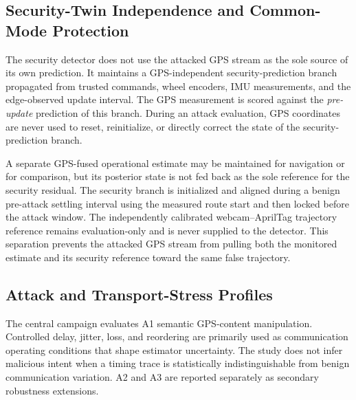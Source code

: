 \documentclass[11pt,a4paper]{article}
\begin{document}
\subsection{Security-Twin Independence and Common-Mode Protection}

The security detector does not use the attacked GPS stream as the sole source
of its own prediction. It maintains a GPS-independent security-prediction
branch propagated from trusted commands, wheel encoders, IMU measurements, and
the edge-observed update interval. The GPS measurement is scored against the
\emph{pre-update} prediction of this branch. During an attack evaluation, GPS
coordinates are never used to reset, reinitialize, or directly correct the
state of the security-prediction branch.

A separate GPS-fused operational estimate may be maintained for navigation or
for comparison, but its posterior state is not fed back as the sole reference
for the security residual. The security branch is initialized and aligned
during a benign pre-attack settling interval using the measured route start and
then locked before the attack window. The independently calibrated
webcam--AprilTag trajectory
reference remains evaluation-only and is never supplied to the detector. This
separation prevents the attacked GPS stream from pulling both the monitored
estimate and its security reference toward the same false trajectory.

\subsection{Attack and Transport-Stress Profiles}

The central campaign evaluates A1 semantic GPS-content manipulation. Controlled
delay, jitter, loss, and reordering are primarily used as communication
operating conditions that shape estimator uncertainty. The study does not infer
malicious intent when a timing trace is statistically indistinguishable from
benign communication variation. A2 and A3 are reported separately as secondary
robustness extensions.
\end{document}
